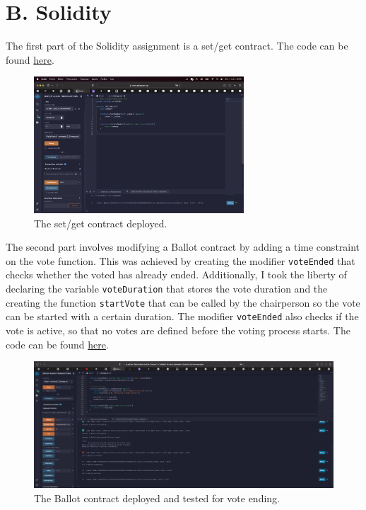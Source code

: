 \documentclass{article}
\begin{document}
\newpage

\section*{B. Solidity}

The first part of the Solidity assignment is a set/get contract. The code can be found \href{https://github.com/dbsc/zku/blob/main/background_assignment/helloworld.sol}{here}.

\begin{figure}[h]
    \centering
    \includegraphics[width=0.7\textwidth]{screenshots/number.png}
    \caption*{The set/get contract deployed.}
\end{figure}

The second part involves modifying a Ballot contract by adding a time constraint on the vote function. This was achieved by creating the modifier \texttt{voteEnded} that checks whether the voted has already ended. Additionally, I took the liberty of declaring the variable \texttt{voteDuration} that stores the vote duration and the creating the function \texttt{startVote} that can be called by the chairperson so the vote can be started with a certain duration. The modifier \texttt{voteEnded} also checks if the vote is active, so that no votes are defined before the voting process starts. The code can be found \href{https://github.com/dbsc/zku/blob/main/background_assignment/helloworld.sol}{here}.

\begin{figure}[h]
    \centering
    \includegraphics[width=\textwidth]{screenshots/ballot.png}
    \caption*{The Ballot contract deployed and tested for vote ending.}
\end{figure}
\end{document}
